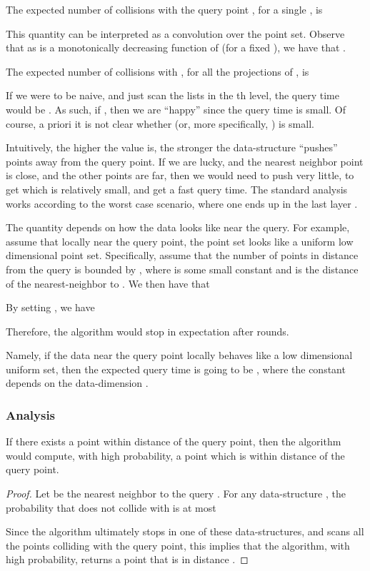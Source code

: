 \documentclass[12pt]{article}\usepackage[cm]{fullpage}
\theoremstyle{remark}\theoremheaderfont{\sf}\theorembodyfont{\upshape}\newtheorem{defn}[theorem]{Definition}
\numberwithin{figure}{section}\numberwithin{table}{section}\numberwithin{equation}{section}
\newcommand{\exmlab}[1]{\label{example:#1}}
\newcommand{\lemlab}[1]{\label{lemma:#1}}
\renewcommand{\th}{th\xspace}
\begin{document}
The expected number of collisions with the query point , for a single
, is

This quantity can be interpreted as a convolution over the point set.
Observe that as  is a monotonically decreasing function
of  (for a fixed ), we have that
.

The expected number of collisions with , for all the
projections of , is

If we were to be naive, and just scan the lists in the \th level,
the query time would be .  As such, if
, then we are ``happy'' since the query time is
small. Of course, a priori it is not clear whether  (or, more
specifically, ) is small.

Intuitively, the higher the value  is, the stronger the
data-structure ``pushes'' points away from the query point. If we are
lucky, and the nearest neighbor point is close, and the other points
are far, then we would need to push very little, to get  which is
relatively small, and get a fast query time. The standard \LSH
analysis works according to the worst case scenario, where one ends up
in the last layer .


\begin{example}
    \exmlab{low:dim}The quantity  depends on how the data looks like near
    the query. For example, assume that locally near the query point,
    the point set looks like a uniform low dimensional point
    set. Specifically, assume that the number of points in distance
     from the query is bounded by
    , where  is some small
    constant and  is the distance of the nearest-neighbor to
    . We then have that
    
    By setting , we have
    
    Therefore, the algorithm would stop in expectation after 
    rounds. 

    Namely, if the data near the query point locally behaves like a
    low dimensional uniform set, then the expected query time is going
    to be , where the constant depends on the
    data-dimension .
\end{example}




\subsubsection{Analysis}
\begin{lemma}
    \lemlab{fast}If there exists a point within distance  of the query point,
    then the algorithm would compute, with high probability, a point
     which is within distance  of the query point.
\end{lemma}
\begin{proof}
    Let  be the nearest neighbor to the query
    .  For any data-structure , the probability that
     does not collide with  is at most
    
    Since the algorithm ultimately stops in one of these
    data-structures, and scans all the points colliding with the query
    point, this implies that the algorithm, with high probability,
    returns a point that is in distance .
\end{proof}
\end{document}
